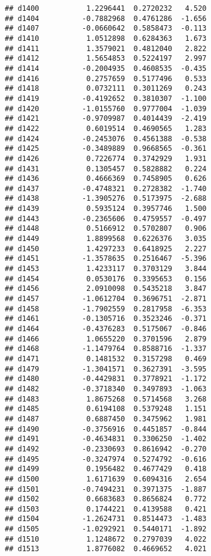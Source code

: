 \documentclass[
]{article}
\begin{document}
\begin{verbatim}
## d1400           1.2296441  0.2720232   4.520
## d1404          -0.7882968  0.4761286  -1.656
## d1407          -0.0660642  0.5858473  -0.113
## d1410           1.0512898  0.6284363   1.673
## d1411           1.3579021  0.4812040   2.822
## d1412           1.5654853  0.5224197   2.997
## d1414          -0.2004935  0.4608535  -0.435
## d1416           0.2757659  0.5177496   0.533
## d1418           0.0732111  0.3011269   0.243
## d1419          -0.4192652  0.3810307  -1.100
## d1420          -1.0155760  0.9777004  -1.039
## d1421          -0.9709987  0.4014439  -2.419
## d1422           0.6019514  0.4690565   1.283
## d1424          -0.2453076  0.4561388  -0.538
## d1425          -0.3489889  0.9668565  -0.361
## d1426           0.7226774  0.3742929   1.931
## d1431           0.1305457  0.5828882   0.224
## d1436           0.4666369  0.7458905   0.626
## d1437          -0.4748321  0.2728382  -1.740
## d1438          -1.3905276  0.5173975  -2.688
## d1439           0.5935124  0.3957746   1.500
## d1443          -0.2365606  0.4759557  -0.497
## d1448           0.5166912  0.5702807   0.906
## d1449           1.8899568  0.6226376   3.035
## d1450           1.4297233  0.6418925   2.227
## d1451          -1.3578635  0.2516467  -5.396
## d1453           1.4233117  0.3703129   3.844
## d1454           0.0530176  0.3395653   0.156
## d1456           2.0910098  0.5435218   3.847
## d1457          -1.0612704  0.3696751  -2.871
## d1458          -1.7902559  0.2817958  -6.353
## d1461          -0.1305716  0.3523246  -0.371
## d1464          -0.4376283  0.5175067  -0.846
## d1466           1.0655220  0.3701596   2.879
## d1468          -1.1479764  0.8588716  -1.337
## d1471           0.1481532  0.3157298   0.469
## d1479          -1.3041571  0.3627391  -3.595
## d1480          -0.4429831  0.3778921  -1.172
## d1482          -0.3718340  0.3497893  -1.063
## d1483           1.8675268  0.5714568   3.268
## d1485           0.6194108  0.5379248   1.151
## d1487           0.6887450  0.3475962   1.981
## d1490          -0.3756916  0.4451857  -0.844
## d1491          -0.4634831  0.3306250  -1.402
## d1492          -0.2330693  0.8616942  -0.270
## d1495          -0.3247974  0.5274792  -0.616
## d1499           0.1956482  0.4677429   0.418
## d1500           1.6171639  0.6094316   2.654
## d1501          -0.7494231  0.3971375  -1.887
## d1502           0.6683683  0.8656824   0.772
## d1503           0.1744221  0.4139588   0.421
## d1504          -1.2624731  0.8514473  -1.483
## d1505          -1.0292921  0.5440171  -1.892
## d1510           1.1248672  0.2797039   4.022
## d1513           1.8776082  0.4669652   4.021

\end{verbatim}
\end{document}
